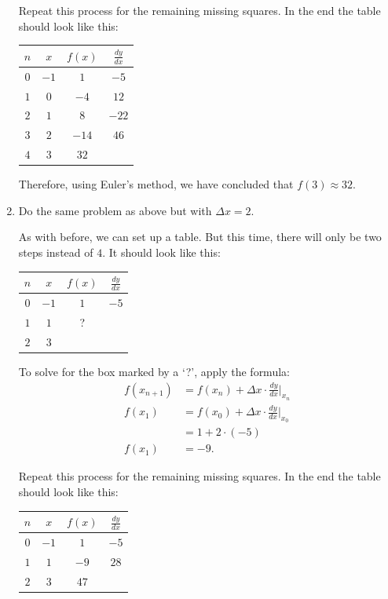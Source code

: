 \begin{enumerate}
	Repeat this process for the remaining missing squares. In the end the table should look like this:
	\begin{table}[H]
		\centering
		\begin{tabular}{|c|c|c|c|}
			\hline
			$n$ & $x$ & $f(x)$ & $\frac{dy}{dx}$ \\
			\hline \hline
			$0$ & $-1$ & $1$ & $-5$ \\
			\hline
			$1$ & $0$ & $-4$ & $12$ \\
			\hline
			$2$ & $1$ & $8$ & $-22$ \\
			\hline
			$3$ & $2$ & $-14$ & $46$ \\
			\hline
			$4$ & $3$ & $32$ & \\
			\hline
		\end{tabular}
	\end{table}

	Therefore, using Euler's method, we have concluded that $f(3) \approx 32$.

	\item Do the same problem as above but with $\Delta x = 2$.

	As with before, we can set up a table. But this time, there will only be two steps instead of $4$. It should look like this:
	\begin{table}[H]
		\centering
		\begin{tabular}{|c|c|c|c|}
			\hline
			$n$ & $x$ & $f(x)$ & $\frac{dy}{dx}$ \\
			\hline \hline
			$0$ & $-1$ & $1$ & $-5$ \\
			\hline
			$1$ & $1$ & ? & \\
			\hline
			$2$ & $3$ & & \\
			\hline
		\end{tabular}
	\end{table}

	To solve for the box marked by a `?', apply the formula:
	\begin{align*}
		f(x_{n + 1}) &= f(x_n) + \Delta x \cdot \frac{dy}{dx} \Big|_{x_n} \\[5pt]
		f(x_1) &= f(x_0) + \Delta x \cdot \frac{dy}{dx} \Big|_{x_0} \\[5pt]
		&= 1 + 2 \cdot (-5) \\
		f(x_1) &= -9.
	\end{align*}

	Repeat this process for the remaining missing squares. In the end the table should look like this:
	\begin{table}[H]
		\centering
		\begin{tabular}{|c|c|c|c|}
			\hline
			$n$ & $x$ & $f(x)$ & $\frac{dy}{dx}$ \\
			\hline \hline
			$0$ & $-1$ & $1$ & $-5$ \\
			\hline
			$1$ & $1$ & $-9$ & $28$ \\
			\hline
			$2$ & $3$ & $47$ & \\
			\hline
		\end{tabular}
	\end{table}


\end{enumerate}
